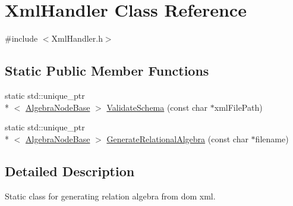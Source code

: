 \hypertarget{class_xml_handler}{\section{Xml\+Handler Class Reference}
\label{class_xml_handler}
}


{\ttfamily \#include $<$Xml\+Handler.\+h$>$}

\subsection*{Static Public Member Functions}
\begin{DoxyCompactItemize}
\item 
static std\+::unique\+\_\+ptr\\*
$<$ \hyperlink{class_algebra_node_base}{Algebra\+Node\+Base} $>$ \hyperlink{class_xml_handler_ae43484089c410e94ea54c1f8e7545559}{Validate\+Schema} (const char $\ast$xml\+File\+Path)
\item 
static std\+::unique\+\_\+ptr\\*
$<$ \hyperlink{class_algebra_node_base}{Algebra\+Node\+Base} $>$ \hyperlink{class_xml_handler_a055645461fb5e727208e3282176e4220}{Generate\+Relational\+Algebra} (const char $\ast$filename)
\end{DoxyCompactItemize}


\subsection{Detailed Description}
Static class for generating relation algebra from dom xml. 

